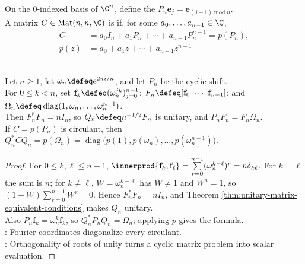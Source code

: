 \begin{definition} \label{def:circulant-matrix-cyclic-shift} \\
On the $0$-indexed basis of $\C^n$, define the 
$P_n\mathbf{e}_j=\mathbf{e}_{(j-1)\operatorname{mod} n}$.\\
A matrix $C\in\operatorname{Mat}(n,n,\C)$ is  if, for some $a_0,\ldots,a_{n-1}\in\C$,
\begin{align}
C&=a_0I_n+a_1P_n+\cdots+a_{n-1}P_n^{n-1}=p(P_n), \nonumber\\
p(z)&=a_0+a_1z+\cdots+a_{n-1}z^{n-1} \nonumber
\end{align}
\end{definition}

\begin{theorem} \label{thm:fourier-basis-diagonalizes-cyclic-circulants} \\
Let $n\geq1$, let $\omega_n\defeq e^{2\pi i/n}$, and let $P_n$ be the cyclic shift.\\
For $0\leq k<n$, set $\mathbf{f}_k\defeq(\omega_n^{jk})_{j=0}^{n-1}$; $F_n\defeq[\mathbf{f}_0\ \cdots\ \mathbf{f}_{n-1}]$; and $\Omega_n\defeq\operatorname{diag}(1,\omega_n,\ldots,\omega_n^{n-1})$.\\
Then $F_n^*F_n=nI_n$, so $Q_n\defeq n^{-1/2}F_n$ is unitary, and $P_nF_n=F_n\Omega_n$.\\
If $C=p(P_n)$ is circulant, then $Q_n^*CQ_n=p(\Omega_n) =\operatorname{diag}\bigl(p(1),p(\omega_n),\ldots,p(\omega_n^{n-1})\bigr)$.
\begin{proof}
For $0\leq k,\ell\leq n-1$, $\innerprod{\mathbf{f}_k,\mathbf{f}_\ell} =\sum\limits_{r=0}^{n-1}(\omega_n^{k-\ell})^r =n\delta_{k\ell}$.
For $k=\ell$ the sum is $n$; for $k\neq\ell$, $W=\omega_n^{k-\ell}$ has $W\neq1$ and $W^n=1$, so $(1-W)\sum\limits_{r=0}^{n-1}W^r=0$. Hence $F_n^*F_n=nI_n$, and Theorem \ref{thm:unitary-matrix-equivalent-conditions} makes $Q_n$ unitary.\\
Also $P_n\mathbf{f}_k=\omega_n^k\mathbf{f}_k$, so $Q_n^*P_nQ_n=\Omega_n$; applying $p$ gives the formula.\\
: Fourier coordinates diagonalize every circulant.\\
: Orthogonality of roots of unity turns a cyclic matrix problem into scalar evaluation.
\end{proof}
\end{theorem}

